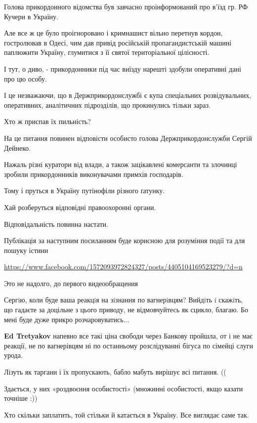 \begin{itemize}
Голова прикордонного відомства був завчасно проінформований про в’їзд гр. РФ Кучери в Україну.

Але все ж це було проігноровано і кримнашист вільно перетнув кордон,
гостролював в Одесі, чим дав привід російській пропагандистській машині
паплюжити Україну, глумитися з її святої територіальної цілісності.

І тут, о диво, - прикордонники під час виїзду нарешті здобули оперативні дані
про цю особу.

І це незважаючи, що в Держприкордонслужбі є купа спеціальних розвідувальних,
оперативних, аналітичних підрозділів, що прокинулись тільки зараз.

Хто ж приспав їх пильність?

На це питання повинен відповісти особисто голова Держприкордонслужби Сергій Дейнеко.

Нажаль різні куратори від влади, а також зацікавлені комерсанти та злочинці
зробили прикордонників виконувачами примхів господарів.

Тому і пруться в Україну путінофіли різного ґатунку.

Хай розберуться відповідні правоохоронні органи.

Відповідальність повинна настати.

Публікація за наступним посиланням буде корисною для розуміння події та для пошуку істини

\url{https://www.facebook.com/1572093972824327/posts/4405104169523279/?d=n}

Это не надолго, до первого видеообращения


Сергiю, коли буде ваша реакцiя на зiзнання по вагнерiвцям? Вийдiть i скажiть,
що гадаєте за доцільне з цього приводу, не відмовчуйтесь як сцикло, благаю. Бо
мені буде дуже прикро розчаровуватись...

\textbf{Ed Tretyakov} напевно все такі ціна свободи через Банкову пройшла, от і
не має реакції, не по вагнерівцям ні по останньому розслідуванні бігуса по
сімейці слуги урода.

Лізуть як таргани і їх пропускають, бабло мабуть вирішує всі питання. ((

Здається, у них «роздвоєння особистості» (множинні особистості, якщо казати точніше :))

Хто скільки заплатить, той стільки й катається в Україну. Все виглядає саме так.


\end{itemize}

